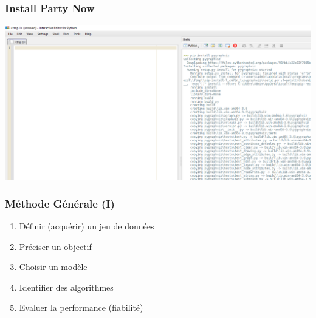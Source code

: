 \documentclass[11pt]{beamer}
\newenvironment{slide}[1]{%
\begin{frame}[environment=slide]
\frametitle{#1}
}{%
\end{frame}
}
\begin{document}
\begin{slide}{Install Party Now}

\includegraphics[scale=0.25]{pyzo}

\end{slide}

\begin{slide}{Méthode Générale (I)}

\begin{enumerate}

\item Définir (acquérir) un jeu de données
\pause
\item Préciser un objectif
\pause
\item Choisir un modèle
\pause
\item Identifier des algorithmes
\pause
\item Evaluer la performance (fiabilité)

\end{enumerate}

\end{slide}
\end{document}
